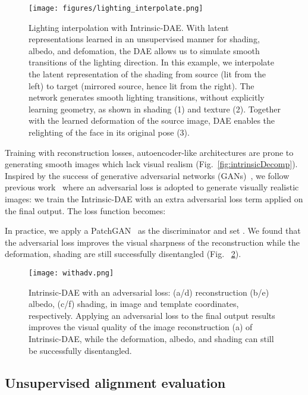 \documentclass[runningheads]{llncs}
\begin{document}
\begin{figure}[ht!]
    \centering
    \texttt{[image: figures/lighting\_interpolate.png]}
    \caption{Lighting interpolation with Intrinsic-DAE. With latent representations learned in an unsupervised manner for shading, albedo, and defomation, the DAE allows us to simulate smooth transitions of the lighting direction. In this example, we interpolate the latent representation of the shading from source (lit from the left) to target (mirrored source, hence lit from the right). The network generates smooth lighting transitions, without explicitly learning geometry, as shown in shading (1) and texture (2). Together with the  learned deformation of the source image, DAE enables the relighting of the face in its original pose (3).}
    \label{fig:lightingInterpolation}
\end{figure}

Training with  reconstruction losses, autoencoder-like architectures are prone to generating smooth images which lack visual realism (Fig.~\ref{fig:intrinsicDecomp}). Inspired by the success of generative adversarial networks (GANs)~\cite{goodfellow2014generative}, we follow previous work~\cite{ShuYHSSS17} where an adversarial loss is adopted to generate visually realistic images: we train the Intrinsic-DAE with an extra adversarial loss term  applied on the final output. The loss function becomes:

In practice, we apply a PatchGAN~\cite{li2016precomputed,pix2pix2016} as the discriminator and set . We found that the adversarial loss improves the visual sharpness of the reconstruction while the deformation, shading are still successfully disentangled (Fig. ~\ref{fig:GAN}).


\begin{figure}[!h]
    \centering
    \texttt{[image: withadv.png]}
    \caption{Intrinsic-DAE with an adversarial loss: (a/d) reconstruction (b/e) albedo, (c/f) shading, in image and template coordinates, respectively. 
    Applying an adversarial loss to the final output results improves the visual quality of the image reconstruction (a) of Intrinsic-DAE, while the deformation, albedo, and shading can still be successfully disentangled.}
    \label{fig:GAN}
\end{figure}

\subsection{Unsupervised alignment evaluation}
\end{document}
